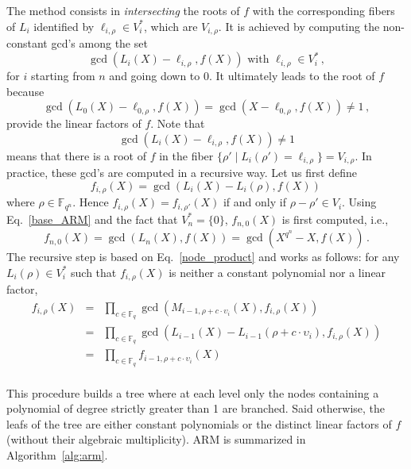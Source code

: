 \documentclass{sig-alternate}
\newcommand{\ff}[1]{\mathbb{F}_{#1}}
\newcommand{\qq}{q}
\newcommand{\nn}{n}
\newcommand{\qn}{{\qq^\nn}}
\newcommand{\basef}{\ff{\qq}}
\newcommand{\extf}{\ff{\qn}}
\renewcommand{\paragraph}[1]{\smallskip\noindent{{\bf \rm #1.}}}
\begin{document}
\paragraph{ARM} The method consists in \emph{intersecting} the roots of $f$ with the corresponding fibers of $L_i$ identified by $\ell_{i,\rho} \in V_i^\ast$, which are $V_{i,\rho}$.
 It is achieved by computing the non-constant gcd's among the set
 \begin{equation}
 \label{base_ARM}
\gcd(L_i(X)-\ell_{i,\rho},f(X))     \mbox{ with }  \ell_{i,\rho}  \in V_i^\ast\,,
\end{equation}
for $i$ starting from $n$ and going down to 0.
It ultimately leads to the root of $f$ because 
$$\gcd(L_0(X)-\ell_{0,\rho},f(X))=\gcd(X-\ell_{0,\rho},f(X)) \ne 1\,,$$ 
provide the linear factors of $f$. 
Note that 
\begin{equation}
  \label{eq:duality-gcd}
  \gcd(L_i(X)-\ell_{i,\rho},f(X)) \ne 1
\end{equation}
means that there is a root of $f$ in the fiber $\{\rho' \mid L_i(\rho')=\ell_{i,\rho} \}=V_{i,\rho}$.
In practice, these gcd's are computed in a recursive way. Let us first define
 $$f_{i,\rho}(X)=\gcd(L_i(X)-L_i(\rho),f(X))\,$$
where $\rho \in \extf$. Hence $f_{i,\rho}(X)=f_{i,\rho'}(X)$ if and only if $\rho-\rho' \in V_i$.
Using Eq.~\eqref{base_ARM} and the fact that $V_n^\ast=\{0\}$, $f_{n,0}(X)$ is first computed, i.e.,
 $$f_{n,0}(X)=\gcd(L_n(X),f(X))=\gcd(X^{q^\nn}-X,f(X))\,.$$
The recursive step is based on Eq.~\eqref{node_product} and works as follows: for any $L_i(\rho) \in V_i^\ast$ such that $f_{i,\rho}(X)$ is neither a constant polynomial nor a linear factor,
  $$
  \begin{array}{lll}
  f_{i,\rho}(X)&=&\prod_{c \in \basef} \gcd(M_{i-1,\rho+c \cdot \upsilon_i}(X),f_{i,\rho}(X)) \\
               &=&\prod_{c \in \basef} \gcd(L_{i-1}(X)-L_{i-1}(\rho+c \cdot \upsilon_i),f_{i,\rho}(X)) \\
               &=&\prod_{c \in \basef} f_{i-1,\rho+c \cdot  \upsilon_i}(X)\\
  \end{array}              
  $$ 
 
 This procedure builds a tree where at each level only the nodes containing a polynomial of degree strictly greater than 1 are branched. Said otherwise, the leafs of the tree are either constant polynomials or the distinct linear factors of $f$ (without their algebraic multiplicity). ARM is summarized in Algorithm~\ref{alg:arm}.
\end{document}
